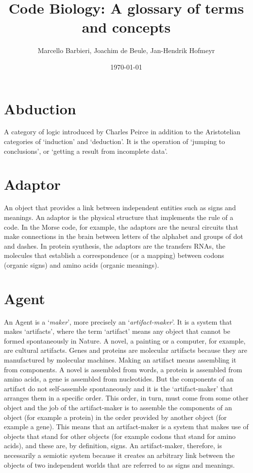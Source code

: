 \documentclass[12pt]{article}
\title{Code Biology: A glossary of terms and concepts}
\author{Marcello Barbieri, Joachim de Beule, Jan-Hendrik Hofmeyr}
\date{\today}
\begin{document}
\maketitle

\setcounter{secnumdepth}{0}
\tableofcontents

\newpage

\section{Abduction}
A category of logic introduced by Charles Peirce in addition to the Aristotelian categories of `induction' and `deduction'. It is the operation of `jumping to conclusions', or `getting a result from incomplete data'. 


\hypertarget{adaptor}{}
\section{Adaptor}
An object that provides a link between independent entities such as signs and meanings. An adaptor is the physical structure that implements the rule of a code. In the Morse code, for example, the adaptors are the neural circuits that make connections in the brain between letters of the alphabet and groups of dot and dashes. In protein synthesis, the adaptors are the transfers RNAs, the molecules that establish a correspondence (or a mapping) between codons (organic signs) and amino acids (organic meanings). 


\hypertarget{agent}{}
\section{Agent}
An Agent is a `\textit{maker}', more precisely an `\textit{artifact-maker}'. It is a system that makes `artifacts', where the term `artifact' means any object that cannot be formed spontaneously in Nature. A novel, a painting or a computer, for example, are cultural artifacts. Genes and proteins are molecular artifacts because they are manufactured by molecular machines. Making an artifact means assembling it from components. A novel is assembled from words, a protein is assembled from amino acids, a gene is assembled from nucleotides. But the components of an artifact do not self-assemble spontaneously and it is the `artifact-maker' that arranges them in a specific order. This order, in turn, must come from some other object and the job of the artifact-maker is to assemble the components of an object (for example a protein) in the order provided by another object (for example a gene). This means that an artifact-maker is a system that makes use of objects that stand for other objects (for example codons that stand for amino acids), and these are, by definition, signs. An artifact-maker, therefore, is necessarily a semiotic system because it creates an arbitrary link between the objects of two independent worlds that are referred to as signs and meanings.
\end{document}
